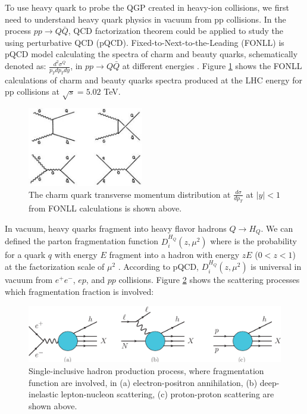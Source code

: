 To use heavy quark to probe the QGP created in heavy-ion collisions, we first need to understand heavy quark physics in vacuum from pp collisions. In the process $pp \rightarrow Q \bar Q$, QCD factorization theorem could be applied to study the using perturbative QCD (pQCD). Fixed-to-Next-to-the-Leading (FONLL) is pQCD model calculating the spectra of charm and beauty quarks, schematically denoted as: $\frac{d^2\sigma^Q}{p_T dp_T dy}$, in $pp \rightarrow Q  \bar Q$ at different energies \cite{FONLLRef}. Figure \ref{FONLL} shows the FONLL calculations of charm and beauty quarks spectra produced at the LHC energy for pp collisions at $\sqrt s = 5.02$ TeV.

 \begin{figure}[hbtp]
\begin{center}
\includegraphics[width=0.45\textwidth]{Figures/Chapter1/HQDiagram.jpg}
\caption{The charm quark transverse momentum distribution at $\frac{d\sigma}{dp_T}$ at $|y| < 1$ from FONLL calculations is shown above.}
\label{FONLL}
\end{center}
\end{figure}   

In vacuum, heavy quarks fragment into heavy flavor hadrons $Q \rightarrow H_Q$. We can defined the parton fragmentation function $D^{H_Q}_{i}(z,\mu^2)$ where is the probability for a quark $q$ with energy $E$ fragment into a hadron with energy $zE$ ($0 < z < 1$) at the factorization scale of $\mu^2$ \cite{QCDFFunc}. According to pQCD, $D^{H_Q}_{i}(z,\mu^2)$ is universal in vacuum from $e^+e^-$, $ep$, and $pp$ collisions. Figure \ref{FFProcess} shows the scattering processes which fragmentation fraction is involved:

 \begin{figure}[hbtp]
\begin{center}
\includegraphics[width=1.0\textwidth]{Figures/Chapter1/FFProcess.png}
\caption{Single-inclusive hadron production process, where fragmentation function are involved, in (a) electron-positron annihilation, (b) deep-inelastic lepton-nucleon scattering, (c) proton-proton scattering are shown above.}
\label{FFProcess}
\end{center}
\end{figure}   

